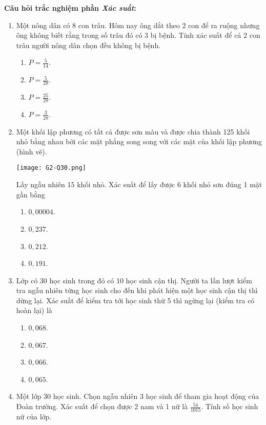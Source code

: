 \noindent\textbf{Câu hỏi trắc nghiệm phần \textit{Xác suất}:}
\begin{enumerate}[label=\textbf{Câu \arabic*.},align=left,left=0cm..0cm,itemindent=*]
	\item Một nông dân có 8 con trâu. Hôm nay ông dắt theo 2 con để ra ruộng nhưng ông không biết rằng trong số trâu đó có 3 bị bệnh. Tính xác suất để cả 2 con trâu người nông dân chọn đều không bị bệnh.
	\begin{enumerate}[label=\textbf{\Alph*.},align=left,left=1cm..0cm,itemindent=*]
		\item $P=\frac 5{14}$. \item $P=\frac 5{28}$. \item $P=\frac{25}{28}$. \item $P=\frac 3{28}$.
	\end{enumerate}
	\item Một khối lập phương có tất cả được sơn màu và được chia thành 125 khối nhỏ bằng nhau bởi các mặt phẳng song song với các mặt của khối lập phương (hình vẽ).\par
	{\centering\texttt{[image: G2-Q30.png]}\par}
	Lấy ngẫu nhiên 15 khối nhỏ. Xác suất để lấy được 6 khối nhỏ sơn đúng 1 mặt gần bằng
	\begin{enumerate}[label=\textbf{\Alph*.},align=left,left=1cm..0cm,itemindent=*]
		\item $0,00004$. \item $0,237$. \item $0,212$. \item $0,191$.
	\end{enumerate}
	\item Lớp có 30 học sinh trong đó có 10 học sinh cận thị. Người ta lần lượt kiểm tra ngẫu nhiên từng học sinh cho đến khi phát hiện một học sinh cận thị thì dừng lại. Xác suất để kiểm tra tới học sinh thứ 5 thì ngừng lại (kiểm tra có hoàn lại) là
	\begin{enumerate}[label=\textbf{\Alph*.},align=left,left=1cm..0cm,itemindent=*]
		\item $0,068$. \item $0,067$. \item $0,066$. \item $0,065$.
	\end{enumerate}
	\item Một lớp 30 học sinh. Chọn ngẫu nhiên 3 học sinh để tham gia hoạt động của Đoàn trường. Xác suất để chọn được 2 nam và 1 nữ là $\frac{54}{1015}$. Tính số học sinh nữ của lớp.

\end{enumerate}
